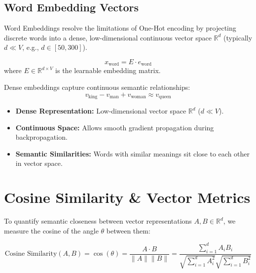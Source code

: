 \subsection{Word Embedding Vectors}

Word Embeddings resolve the limitations of One-Hot encoding by projecting discrete words into a dense, low-dimensional continuous vector space $\mathbb{R}^d$ (typically $d \ll V$, e.g., $d \in [50, 300]$).

\begin{equation}
x_{\text{word}} = E \cdot e_{\text{word}}
\end{equation}
where $E \in \mathbb{R}^{d \times V}$ is the learnable embedding matrix.

Dense embeddings capture continuous semantic relationships:
\begin{equation}
v_{\text{king}} - v_{\text{man}} + v_{\text{woman}} \approx v_{\text{queen}}
\end{equation}

\begin{advbox}
\begin{itemize}
    \item \textbf{Dense Representation:} Low-dimensional vector space $\mathbb{R}^d$ ($d \ll V$).
    \item \textbf{Continuous Space:} Allows smooth gradient propagation during backpropagation.
    \item \textbf{Semantic Similarities:} Words with similar meanings sit close to each other in vector space.
\end{itemize}
\end{advbox}

\section{Cosine Similarity \& Vector Metrics}

To quantify semantic closeness between vector representations $A, B \in \mathbb{R}^d$, we measure the cosine of the angle $\theta$ between them:

\begin{equation}
\text{Cosine Similarity}(A, B) = \cos(\theta) = \frac{A \cdot B}{\|A\| \|B\|} = \frac{\sum_{i=1}^d A_i B_i}{\sqrt{\sum_{i=1}^d A_i^2} \sqrt{\sum_{i=1}^d B_i^2}}
\end{equation}

